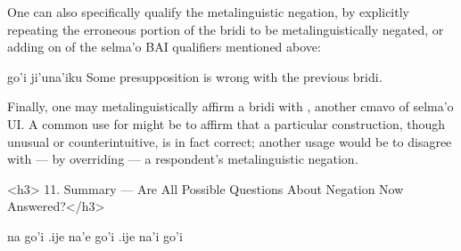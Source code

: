 One can also specifically qualify the metalinguistic
    negation, by explicitly repeating the erroneous portion of the
    bridi to be metalinguistically negated, or adding on of the
    selma'o BAI qualifiers mentioned above:
\begin{example}
go'i ji'una'iku\n
Some presupposition is wrong with the previous bridi.
\end{example}

Finally, one may metalinguistically affirm a bridi with
    , another cmavo of selma'o UI. A common use for
     might be to affirm that a particular construction,
    though unusual or counterintuitive, is in fact correct; another
    usage would be to disagree with --- by overriding --- a
    respondent's metalinguistic negation.

<h3>
11. Summary --- Are All Possible Questions About Negation
    Now Answered?</h3>
\begin{example}
na go'i  .ije na'e go'i  .ije na'i go'i
\end{example}